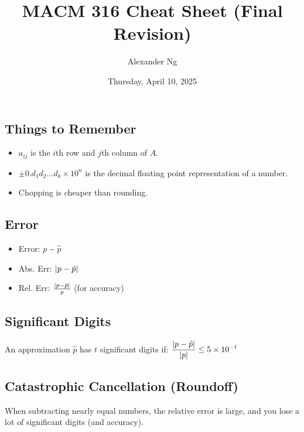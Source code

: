 \documentclass[8pt, letterpaper]{extarticle}
\begin{document}
\title{MACM 316 Cheat Sheet (Final Revision)}
\author{Alexander Ng}
\date{Thursday, April 10, 2025}


\begin{multicols*}{3}
  \section{Things to Remember}
  \begin{itemize}
    \item $a_{ij}$ is the $i$th row and $j$th column of $A$.
    \item $\pm 0.d_1d_2\dots d_k \times 10^n$ is the decimal floating point 
      representation of a number.
    \item Chopping is cheaper than rounding.
  \end{itemize}

  \subsection{Error}
  \begin{itemize} %
    \item Error: $p - \hat{p}$
    \item Abs. Err: $\abs{p - \hat{p}}$
    \item Rel. Err: $\frac{\abs{p - \hat{p}}}{p}$ (for accuracy)
  \end{itemize}

  \subsection{Significant Digits}
  An approximation $\hat p$ has $t$ significant digits if: \newline
  $\displaystyle \frac{\abs{p-\hat p}}{\abs{p}} \leq 5 \times 10^{-t}$

  \subsection{Catastrophic Cancellation (Roundoff)}
  When subtracting nearly equal numbers, the relative error is large, and you
  lose a lot of significant digits (and accuracy).


\end{multicols*}
\end{document}
